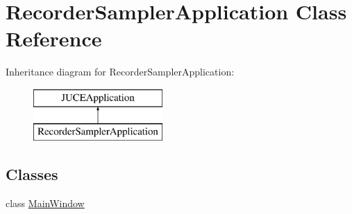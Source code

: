 \hypertarget{class_recorder_sampler_application}{}\section{Recorder\+Sampler\+Application Class Reference}
\label{class_recorder_sampler_application}
Inheritance diagram for Recorder\+Sampler\+Application\+:\begin{figure}[H]
\begin{center}
\leavevmode
\includegraphics[height=2.000000cm]{class_recorder_sampler_application}
\end{center}
\end{figure}
\subsection*{Classes}
\begin{DoxyCompactItemize}
\item 
class \mbox{\hyperlink{class_recorder_sampler_application_1_1_main_window}{Main\+Window}}
\end{DoxyCompactItemize}
